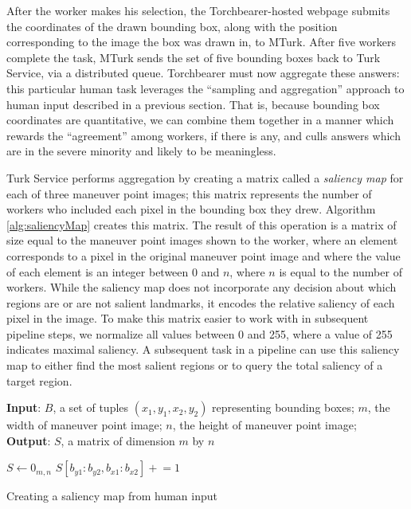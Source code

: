 After the worker makes his selection, the Torchbearer-hosted webpage submits the coordinates of the drawn bounding box, along with the position corresponding to the image the box was drawn in, to MTurk. After five workers complete the task, MTurk sends the set of five bounding boxes back to Turk Service, via a distributed queue. Torchbearer must now aggregate these answers: this particular human task leverages the “sampling and aggregation” approach to human input described in a previous section. That is, because bounding box coordinates are quantitative, we can combine them together in a manner which rewards the “agreement” among workers, if there is any, and culls answers which are in the severe minority and likely to be meaningless. 

Turk Service performs aggregation by creating a matrix called a \textit{saliency map} for each of three maneuver point images; this matrix represents the number of workers who included each pixel in the bounding box they drew. Algorithm \ref{alg:saliencyMap} creates this matrix. The result of this operation is a matrix of size equal to the maneuver point images shown to the worker, where an element corresponds to a pixel in the original maneuver point image and where the value of each element is an integer between 0 and $n$, where $n$ is equal to the number of workers. While the saliency map does not incorporate any decision about which regions are or are not salient landmarks, it encodes the relative saliency of each pixel in the image. To make this matrix easier to work with in subsequent pipeline steps, we normalize all values between 0 and 255, where a value of 255 indicates maximal saliency. A subsequent task in a pipeline can use this saliency map to either find the most salient regions or to query the total saliency of a target region.

\begin{algorithm}[htbp]
\textbf{Input}: $B$, a set of tuples $(x_1, y_1, x_2, y_2)$ representing bounding boxes;
$m$, the width of maneuver point image;
$n$, the height of maneuver point image; \\
\textbf{Output}: $S$, a matrix of dimension $m$ by $n$ 
\begin{algorithmic}[1]
\STATE $S\gets 0_{m,n}$
    \STATE $S[b_{y1}:b_{y2}, b_{x1}:b_{x2}] \mathrel{+}= 1$
\ENDFOR
{}
\end{algorithmic}
\caption{Creating a saliency map from human input}\label{alg:saliencyMap}
\label{alg:saliencyMap}
\end{algorithm} 

